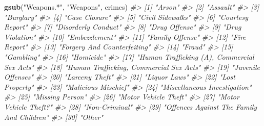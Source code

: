 \documentclass[
  12pt,
]{book}
\newenvironment{Shaded}{\begin{snugshade}}{\end{snugshade}}
\newcommand{\CommentTok}[1]{\textcolor[rgb]{0.37,0.37,0.37}{\textit{#1}}}
\newcommand{\KeywordTok}[1]{\textcolor[rgb]{0.27,0.27,0.27}{\textbf{#1}}}
\newcommand{\NormalTok}[1]{#1}
\newcommand{\StringTok}[1]{\textcolor[rgb]{0.5,0.5,0.5}{#1}}
\begin{document}
\begin{Shaded}
\begin{Highlighting}[]
\KeywordTok{gsub}\NormalTok{(}\StringTok{"Weapons.*"}\NormalTok{, }\StringTok{"Weapons"}\NormalTok{, crimes)}
\CommentTok{\#\textgreater{}  [1] "Arson"                                     }
\CommentTok{\#\textgreater{}  [2] "Assault"                                   }
\CommentTok{\#\textgreater{}  [3] "Burglary"                                  }
\CommentTok{\#\textgreater{}  [4] "Case Closure"                              }
\CommentTok{\#\textgreater{}  [5] "Civil Sidewalks"                           }
\CommentTok{\#\textgreater{}  [6] "Courtesy Report"                           }
\CommentTok{\#\textgreater{}  [7] "Disorderly Conduct"                        }
\CommentTok{\#\textgreater{}  [8] "Drug Offense"                              }
\CommentTok{\#\textgreater{}  [9] "Drug Violation"                            }
\CommentTok{\#\textgreater{} [10] "Embezzlement"                              }
\CommentTok{\#\textgreater{} [11] "Family Offense"                            }
\CommentTok{\#\textgreater{} [12] "Fire Report"                               }
\CommentTok{\#\textgreater{} [13] "Forgery And Counterfeiting"                }
\CommentTok{\#\textgreater{} [14] "Fraud"                                     }
\CommentTok{\#\textgreater{} [15] "Gambling"                                  }
\CommentTok{\#\textgreater{} [16] "Homicide"                                  }
\CommentTok{\#\textgreater{} [17] "Human Trafficking (A), Commercial Sex Acts"}
\CommentTok{\#\textgreater{} [18] "Human Trafficking, Commercial Sex Acts"    }
\CommentTok{\#\textgreater{} [19] "Juvenile Offenses"                         }
\CommentTok{\#\textgreater{} [20] "Larceny Theft"                             }
\CommentTok{\#\textgreater{} [21] "Liquor Laws"                               }
\CommentTok{\#\textgreater{} [22] "Lost Property"                             }
\CommentTok{\#\textgreater{} [23] "Malicious Mischief"                        }
\CommentTok{\#\textgreater{} [24] "Miscellaneous Investigation"               }
\CommentTok{\#\textgreater{} [25] "Missing Person"                            }
\CommentTok{\#\textgreater{} [26] "Motor Vehicle Theft"                       }
\CommentTok{\#\textgreater{} [27] "Motor Vehicle Theft?"                      }
\CommentTok{\#\textgreater{} [28] "Non{-}Criminal"                              }
\CommentTok{\#\textgreater{} [29] "Offences Against The Family And Children"  }
\CommentTok{\#\textgreater{} [30] "Other"                                     }

\end{Highlighting}
\end{Shaded}
\end{document}
